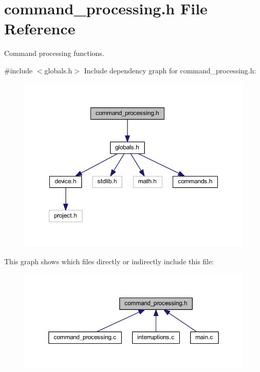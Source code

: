 \section{command\+\_\+processing.\+h File Reference}
\label{command__processing_8h}


Command processing functions.  


{\ttfamily \#include $<$globals.\+h$>$}\newline
Include dependency graph for command\+\_\+processing.\+h\+:
\nopagebreak
\begin{figure}[H]
\begin{center}
\leavevmode
\includegraphics[width=350pt]{command__processing_8h__incl}
\end{center}
\end{figure}
This graph shows which files directly or indirectly include this file\+:
\nopagebreak
\begin{figure}[H]
\begin{center}
\leavevmode
\includegraphics[width=350pt]{command__processing_8h__dep__incl}
\end{center}
\end{figure}

